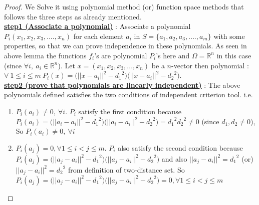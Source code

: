 \begin{proof}
We Solve it using polynomial method (or) function space methods that follows the three steps as already mentioned.
\\

\underline{\textbf{step1 (Associate a polynomial)}} : 
Associate a polynomial $P_i(x_1,x_2,x_3,....,x_n)$ for each element $a_i$ in $S=\{a_1,a_2,a_3,....,a_m\}$ with some properties, so that we can prove independence in these polynomials. As seen in above lemma the functions $f_i$'s are polynomial $P_i$'s here and $\Omega = \mathbb{R}^{n}$ in this case (since $\forall i,~a_i \in \mathbb{R}^{n}$). Let $x=(x_1,x_2,x_3,...,x_n)$ be a $n$-vector then polynomial : 
$\forall ~1 \le i \le m ~P_i(x) = \big({||x-a_i||}^2-{d_1}^2\big)\big({||x-a_i||}^2-{d_2}^2\big)$.
\\

\underline{\textbf{step2 (prove that polynomials are linearly independent)}} : 
The above polynomials defined satisfies the two conditions of independent criterion tool. i.e.
\begin{enumerate}
    \item $P_i(a_i) \ne 0,~ \forall i$. $P_i$ satisfy the first condition because $P_i(a_i)= \big({||a_i-a_i||}^2-{d_1}^2\big)\big({||a_i-a_i||}^2-{d_2}^2\big) = {{d_1}^2}{{d_2}^2} \ne 0$ (since $d_1,d_2 \ne 0$), So  $P_i(a_i) \ne 0,~ \forall i$
    \item $P_i(a_j) = 0, \forall 1 \le i <j \le m$. $P_i$ also satisfy the second condition because $P_i(a_j) = \big({||a_j-a_i||}^2-{d_1}^2\big)\big({||a_j-a_i||}^2-{d_2}^2\big)$ and also ${||a_j - a_i||}^2 = {{d_1}^2}$ (or) ${||a_j - a_i||}^2 = {{d_2}^2}$ from definition of two-distance set. So $P_i(a_j) = \big({||a_j-a_i||}^2-{d_1}^2\big)\big({||a_j-a_i||}^2-{d_2}^2\big) = 0, \forall 1 \le i <j \le m$
\end{enumerate}



\end{proof}
